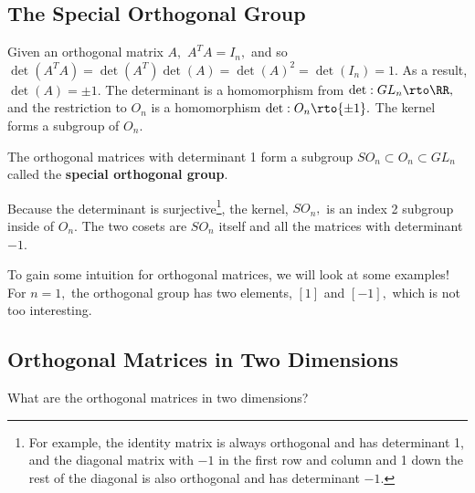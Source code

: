 \subsection{The Special Orthogonal Group}

Given an orthogonal matrix $A,$ $A^TA = I_n,$ and so $\det(A^TA) = \det(A^T)\det(A) = \det(A)^2 = \det(I_n) = 1.$ As a result, $\det(A) = \pm 1.$ The determinant is a homomorphism from $\det: GL_n \rto \RR,$ and the restriction to $O_n$ is a homomorphism $\det: O_n \rto \{\pm 1\}.$ The kernel forms a subgroup of $O_n.$

\begin{definition}
The orthogonal matrices with determinant 1 form a subgroup $SO_n \subset O_n \subset GL_n$ called the \textbf{special orthogonal group}.
\end{definition}

Because the determinant is surjective\footnote{For example, the identity matrix is always orthogonal and has determinant 1, and the diagonal matrix with $-1$ in the first row and column and 1 down the rest of the diagonal is also orthogonal and has determinant $-1$.}, the kernel, $SO_n,$ is an index 2 subgroup inside of $O_n.$ The two cosets are $SO_n$ itself and all the matrices with determinant $-1.$

To gain some intuition for orthogonal matrices, we will look at some examples! For $n = 1,$ the orthogonal group has two elements, $[1]$ and $[-1],$ which is not too interesting.

\subsection{Orthogonal Matrices in Two Dimensions}
What are the orthogonal matrices in two dimensions?

